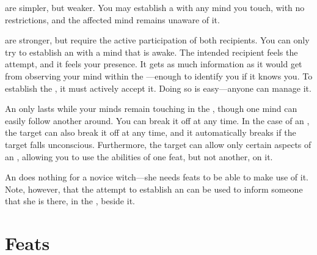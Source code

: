 {\subtleinterfaces} are simpler, but weaker.
You may establish a {\subtleinterface} with any mind you touch, with no restrictions, and the affected mind remains unaware of it.

{\overtinterfaces} are stronger, but require the active participation of both recipients.
You can only try to establish an {\overtinterface} with a mind that is awake.
The intended recipient feels the attempt, and it feels your presence.
It gets as much information as it would get from observing your mind within the {\mentalrealm}---enough to identify you if it knows you.
To establish the {\interface}, it must actively accept it.
Doing so is easy---anyone can manage it.

An {\interface} only lasts while your minds remain touching in the {\mentalrealm}, though one mind can easily follow another around.
You can break it off at any time.
In the case of an {\overtinterface}, the target can also break it off at any time, and it automatically breaks if the target falls unconscious.
Furthermore, the target can allow only certain aspects of an {\overtinterface}, allowing you to use the abilities of one feat, but not another, on it.

An {\interface} does nothing for a novice witch---she needs feats to be able to make use of it.
Note, however, that the attempt to establish an {\overtinterface} can be used to inform someone that she is there, in the {\mentalrealm}, beside it.

\section{Feats}



